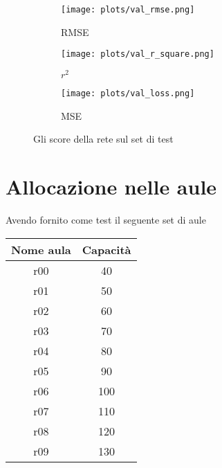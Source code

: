 \begin{figure}
    \centering
    
    \begin{subfigure}[b]{0.45\linewidth}
        \texttt{[image: plots/val\_rmse.png]}
        \caption{RMSE}
    \end{subfigure}
    \begin{subfigure}[b]{0.45\linewidth}
        \texttt{[image: plots/val\_r\_square.png]}
        \caption{$r^2$}
    \end{subfigure}
    \begin{subfigure}[b]{0.9\linewidth}
        \texttt{[image: plots/val\_loss.png]}
        \caption{MSE}
    \end{subfigure}
    \caption{Gli score della rete sul set di test}
    \label{fig:scores_test}
\end{figure}

\newpage

\section{Allocazione nelle aule}
\label{section:results_mp}

Avendo fornito come test il seguente set di aule

\begin{table}[h]
    \begin{small}
        \begin{center}
            \begin{tabular}[c]{c|c}
                Nome aula & Capacità \\
                \hline
                r00 & 40 \\
                r01 & 50 \\
                r02 & 60 \\
                r03 & 70 \\
                r04 & 80 \\
                r05 & 90 \\
                r06 & 100 \\
                r07 & 110 \\
                r08 & 120 \\
                r09 & 130 
            \end{tabular}
        \end{center}
    \end{small}
\end{table}

